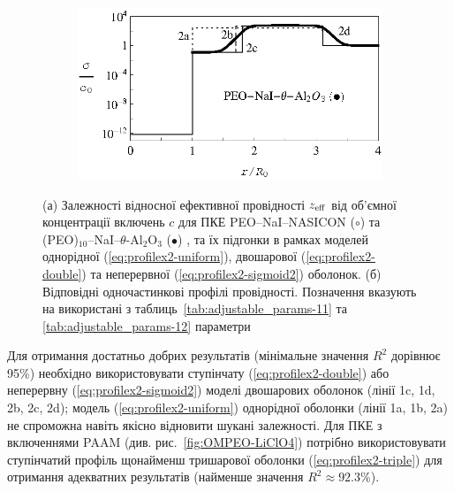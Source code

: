 \documentclass[14pt,twoside]{vakthesis}
\begin{document}
\begin{figure}[!t]
\begin{subfigure}[c]{0.45\textwidth}
		\includegraphics[width=\textwidth]{Fig2_PEO-NaI-theta-Al2O3_Profile.eps}
		\caption{} \label{fig:PEO-NaIb}
	\end{subfigure}
	\caption{\label{fig:PEO-NaI} (а) Залежності відносної ефективної провідності ${z}_{\rm eff}$ від об'ємної концентрації включень $c$ для ПКЕ PEO--NaI--NASICON ($\circ$) \cite{Przl1995} та (PEO)$_{10}$--NaI--$\theta$-Al$_2$O$_3$ ($\bullet$) \cite{Wiec1994}, та їх підгонки в рамках моделей однорідної (\ref{eq:profilex2-uniform}), двошарової (\ref{eq:profilex2-double}) та неперервної (\ref{eq:profilex2-sigmoid2}) оболонок. (б) Відповідні одночастинкові профілі провідності. Позначення вказують на використані з таблиць~\ref{tab:adjustable_params-11} та \ref{tab:adjustable_params-12} параметри}
\end{figure}
Для отримання достатньо добрих результатів {\color{violet}(мінімальне значення $R^2$ дорівнює 95\%)} необхідно використовувати ступінчату (\ref{eq:profilex2-double}) або неперервну (\ref{eq:profilex2-sigmoid2}) моделі двошарових оболонок (лінії 1c, 1d, 2b, 2c, 2d); модель (\ref{eq:profilex2-uniform}) однорідної оболонки (лінії 1a, 1b, 2a) не спроможна навіть якісно відновити шукані залежності. Для ПКЕ з включеннями PAAM \cite{Przl1995, Wiec1994} (див. рис.~\ref{fig:OMPEO-LiClO4}) потрібно використовувати ступінчатий профіль щонайменш тришарової оболонки (\ref{eq:profilex2-triple}) для отримання адекватних результатів {\color{violet}(найменше значення $R^2 \approx 92.3$\%)}.
\end{document}
